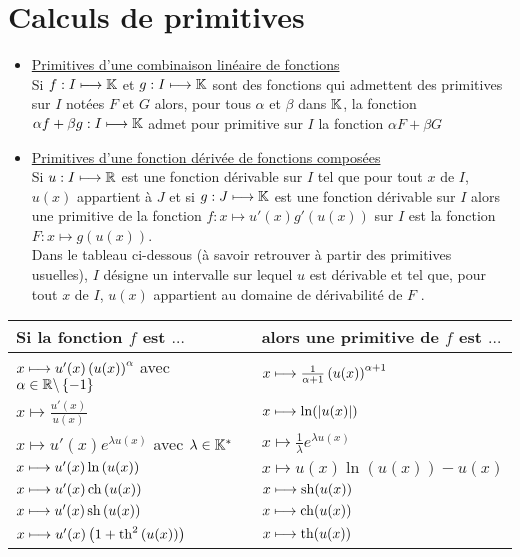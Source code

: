 \section{Calculs de primitives}
\begin{defprop}
    \begin{itemize}
        \item \underline{Primitives d’une combinaison linéaire de fonctions}\\
        Si \(f : I \longmapsto \mathbb{K}\) et \(g : I \longmapsto \mathbb{K}\) sont des fonctions qui admettent des primitives sur \(I\) notées \(F\) et \(G\) alors, pour tous \(\alpha\) et \(\beta\) dans \(\mathbb{K}\), la fonction\( \alpha f + \beta g : I \longmapsto \mathbb{K}\) admet pour primitive sur \(I\) la fonction \( \alpha F + \beta G\)
        \item \underline{Primitives d’une fonction dérivée de fonctions composées} \\
        Si \(u : I \longmapsto \mathbb{R}\) est une fonction dérivable sur \(I\) tel que pour tout \(x\) de \(I\), \(u(x)\) appartient à \(J\) et si \(g : J \longmapsto \mathbb{K} \) est une fonction dérivable sur \(I\) alors une primitive de la fonction \(f : x  \mapsto u'(x)g'(u(x))\) sur \(I\) est la fonction \(F : x  \mapsto g (u(x))\).\\
        Dans le tableau ci-dessous (à savoir retrouver à partir des primitives usuelles), \(I\) désigne un intervalle sur lequel \(u\) est dérivable et tel que, pour tout \(x\) de \(I\), \(u(x)\) appartient au domaine de dérivabilité de \(F\) .
    \end{itemize}
    \renewcommand{\arraystretch}{2.5}
    \begin{center}
        
	    \begin{tabular}{|l|l|}
	    	\hline
	    	Si la fonction \(f\) est \(\dots\) & alors une primitive de \(f\) est \(\dots\) \\
            \hline
            \(x\longmapsto u'(x)\left(u(x)\right)^{\alpha}\) avec \(\alpha \in \mathbb{R}\backslash\left\lbrace-1\right\rbrace\)  & \(x\longmapsto \frac{1}{\alpha+1}\left(u(x)\right)^{\alpha+1} \) \\
            \(x\mapsto \frac{u'(x)}{u(x)}\)  & \(x\longmapsto \ln(\left\lvert u(x)\right\rvert) \) \\
            \hline
            \(x\mapsto u'(x)e^{\lambda u(x)}\) avec \(\lambda \in \mathbb{K}^*\) & \(x\mapsto \frac{1}{\lambda}e^{\lambda u(x)} \) \\
            \(x\longmapsto u'(x)\ln\left(u(x)\right)\) & \(x\mapsto u(x)\ln(u(x))-u(x) \) \\
            \hline
            \(x\longmapsto u'(x)\operatorname{ch}\left(u(x)\right)\) & \(x\longmapsto \operatorname{sh}(u(x)) \) \\
            \(x\longmapsto u'(x)\operatorname{sh}\left(u(x)\right)\) & \(x\longmapsto \operatorname{ch}(u(x)) \) \\
            \(x\longmapsto u'(x)\left(1+\operatorname{th}^2\left(u(x)\right)\right)\) & \(x\longmapsto \operatorname{th}(u(x)) \) \\
            \hline


\end{tabular}
\end{center}
\end{defprop}
